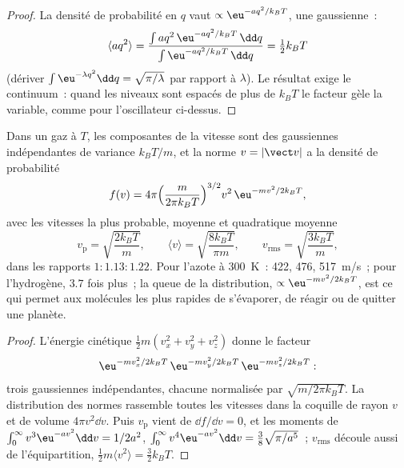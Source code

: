 \begin{proof}
La densité de probabilité en $q$ vaut $\propto\eu^{-aq^2/k_BT}$, une gaussienne~:
\[
\langle aq^2\rangle = \frac{\int aq^2\,\eu^{-aq^2/k_BT}\,\dd q}{\int\eu^{-aq^2/k_BT}\,\dd q} = \tfrac12k_BT
\]
(dériver $\int\eu^{-\lambda q^2}\dd q = \sqrt{\pi/\lambda}$ par rapport à
$\lambda$). Le résultat exige le continuum~: quand les
niveaux sont espacés de plus de $k_BT$ le facteur gèle la variable,
comme pour l'oscillateur ci-dessus.
\end{proof}

\begin{theorem}\label{thm:b2:boltzmann-factor:maxwell}
Dans un gaz à $T$, les composantes de la vitesse sont des gaussiennes indépendantes de
variance $k_BT/m$, et la norme $v = |\vect v|$ a la densité de
probabilité
\[
f(v) = 4\pi\Big(\frac{m}{2\pi k_BT}\Big)^{3/2}v^2\,\eu^{-mv^2/2k_BT} ,
\]
avec les vitesses la plus probable, moyenne et quadratique moyenne
\[
v_{\text{p}} = \sqrt{\frac{2k_BT}{m}}, \qquad
\langle v\rangle = \sqrt{\frac{8k_BT}{\pi m}}, \qquad
v_{\text{rms}} = \sqrt{\frac{3k_BT}{m}} ,
\]
dans les rapports $1 : 1.13 : 1.22$. Pour l'azote à \qty{300}{K}~: \qty{422}{},
\qty{476}{}, \qty{517}{m/s}~; pour l'hydrogène, $3.7$ fois plus~; la
queue de la distribution, $\propto\eu^{-mv^2/2k_BT}$, est ce qui permet aux
molécules les plus rapides de s'évaporer, de réagir ou de quitter une planète.
\end{theorem}

\begin{proof}
L'énergie cinétique $\tfrac12m(v_x^2 + v_y^2 + v_z^2)$ donne le facteur
\[
\eu^{-mv_x^2/2k_BT}\,\eu^{-mv_y^2/2k_BT}\,\eu^{-mv_z^2/2k_BT} :
\]
trois gaussiennes indépendantes, chacune normalisée par $\sqrt{m/2\pi k_BT}$. La distribution
des normes rassemble toutes les vitesses dans la coquille de rayon $v$ et de
volume $4\pi v^2\dd v$. Puis $v_{\text{p}}$ vient de $\dd f/\dd v = 0$, et les
moments de $\int_0^\infty v^3\eu^{-av^2}\dd v = 1/2a^2$, $\int_0^\infty
v^4\eu^{-av^2}\dd v = \tfrac38\sqrt{\pi/a^5}$~; $v_{\text{rms}}$ découle aussi
de l'équipartition, $\tfrac12m\langle v^2\rangle = \tfrac32k_BT$.
\end{proof}

